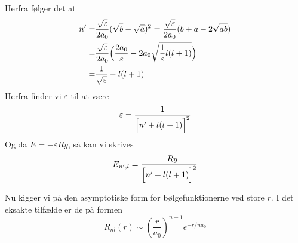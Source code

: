 Herfra følger det at
\begin{align}
  n' = & \frac{\sqrt{\varepsilon}}{2a_0}(\sqrt{b}-\sqrt{a})^2 = \frac{\sqrt{\varepsilon}}{2a_0}(b+a-2\sqrt{ab})\\
     = & \frac{\sqrt{\varepsilon}}{2a_0}\Bigl(\frac{2a_0}{\varepsilon}-2a_0\sqrt{\frac{1}{\varepsilon}l(l+1)}\Bigr)\\
     = & \frac{1}{\sqrt{\varepsilon}} -l(l+1)
\end{align}
Herfra finder vi $\varepsilon$ til at være
\begin{equation}
  \varepsilon = \frac{1}{\Bigl[n'+l(l+1)  \Bigr]^2}
\end{equation}
Og da $E = -\varepsilon Ry$, så kan vi skrives
\begin{equation}
  E_{n',l} = \frac{-Ry}{\Bigl[n'+l(l+1)  \Bigr]^2}
\end{equation}

Nu kigger vi på den asymptotiske form for bølgefunktionerne ved store $r$.
I det eksakte tilfælde er de på formen
\begin{equation}
  R_{nl}(r) \sim \left(\frac{r}{a_0}\right)^{n-1}e^{-r/na_0}
  \label{eq:eksatR}
\end{equation}

